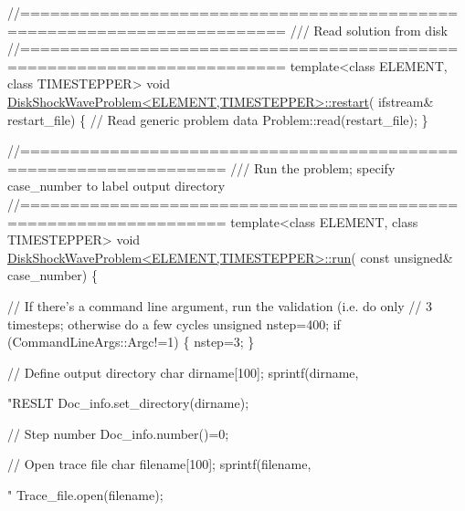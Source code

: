 \begin{DoxyCodeInclude}
{{{{{{{\textcolor{comment}{//========================================================================}\textcolor{comment}{}
\textcolor{comment}{/// Read solution from disk}
\textcolor{comment}{}\textcolor{comment}{//========================================================================}
\textcolor{keyword}{template}<\textcolor{keyword}{class} ELEMENT, \textcolor{keyword}{class} TIMESTEPPER>
\textcolor{keywordtype}{void} \hyperlink{classDiskShockWaveProblem_ae883625e9bbe6ea442413f7c970d3fb1}{DiskShockWaveProblem<ELEMENT,TIMESTEPPER>::restart}(
      ifstream& restart\_file)
\{
 \textcolor{comment}{// Read generic problem data}
 Problem::read(restart\_file);
\}



\textcolor{comment}{//==================================================================}\textcolor{comment}{}
\textcolor{comment}{/// Run the problem; specify case\_number to label output directory}
\textcolor{comment}{}\textcolor{comment}{//==================================================================}
\textcolor{keyword}{template}<\textcolor{keyword}{class} ELEMENT, \textcolor{keyword}{class} TIMESTEPPER>
\textcolor{keywordtype}{void} \hyperlink{classDiskShockWaveProblem_af8dc3befd3eba59b008c315bfe077340}{DiskShockWaveProblem<ELEMENT,TIMESTEPPER>::run}(
 \textcolor{keyword}{const} \textcolor{keywordtype}{unsigned}& case\_number)
\{

 \textcolor{comment}{// If there's a command line argument, run the validation (i.e. do only }
 \textcolor{comment}{// 3 timesteps; otherwise do a few cycles}
 \textcolor{keywordtype}{unsigned} nstep=400;
 \textcolor{keywordflow}{if} (CommandLineArgs::Argc!=1)
  \{
   nstep=3;
  \}

 \textcolor{comment}{// Define output directory}
 \textcolor{keywordtype}{char} dirname[100];
 sprintf(dirname,\textcolor{stringliteral}{"RESLT%
 Doc\_info.set\_directory(dirname);

 \textcolor{comment}{// Step number}
 Doc\_info.number()=0;

 \textcolor{comment}{// Open trace file}
 \textcolor{keywordtype}{char} filename[100];   
 sprintf(filename,\textcolor{stringliteral}{"%
 Trace\_file.open(filename);

}}}}}}}}}
\end{DoxyCodeInclude}

